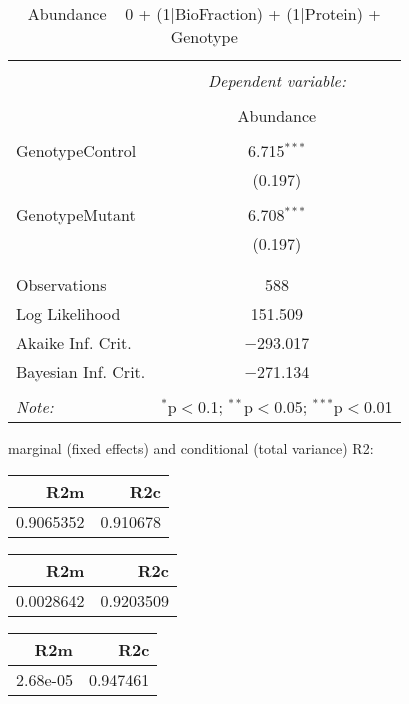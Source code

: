 \documentclass[11pt]{report}
\begin{document}
\begin{table}[!htbp] \centering 
  \caption{Abundance ~ 0 + (1|BioFraction) + (1|Protein) + Genotype} 
  \label{} 
\begin{tabular}{@{\extracolsep{5pt}}lc} 
\\[-1.8ex]\hline 
\hline \\[-1.8ex] 
 & \multicolumn{1}{c}{\textit{Dependent variable:}} \\ 
\cline{2-2} 
\\[-1.8ex] & Abundance \\ 
\hline \\[-1.8ex] 
 GenotypeControl & 6.715$^{***}$ \\ 
  & (0.197) \\ 
  & \\ 
 GenotypeMutant & 6.708$^{***}$ \\ 
  & (0.197) \\ 
  & \\ 
\hline \\[-1.8ex] 
Observations & 588 \\ 
Log Likelihood & 151.509 \\ 
Akaike Inf. Crit. & $-$293.017 \\ 
Bayesian Inf. Crit. & $-$271.134 \\ 
\hline 
\hline \\[-1.8ex] 
\textit{Note:}  & \multicolumn{1}{r}{$^{*}$p$<$0.1; $^{**}$p$<$0.05; $^{***}$p$<$0.01} \\ 
\end{tabular} 
\end{table} 
marginal (fixed effects) and conditional (total variance) R2:

\begin{tabular}{r|r}
\hline
R2m & R2c\\
\hline
0.9065352 & 0.910678\\
\hline
\end{tabular}

\begin{tabular}{r|r}
\hline
R2m & R2c\\
\hline
0.0028642 & 0.9203509\\
\hline
\end{tabular}

\begin{tabular}{r|r}
\hline
R2m & R2c\\
\hline
2.68e-05 & 0.947461\\
\hline
\end{tabular}
\end{document}
